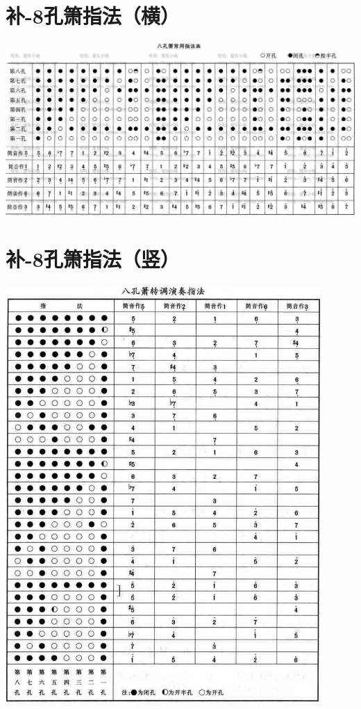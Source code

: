 \documentclass[cn,pad,chinesefont=nofont,twocol]{elegantbook}
\begin{document}
\section{补-8孔箫指法（横）} \center
    \includegraphics[width=0.94\textheight, angle=90]{dongxiao/20200817-8孔箫指法-横}
\section{补-8孔箫指法（竖）}
    \includegraphics[width=0.9\textwidth]{dongxiao/20200817-8孔箫指法-竖}
\end{document}
